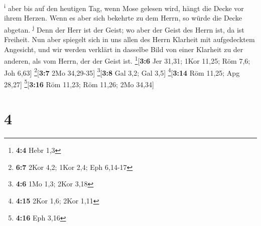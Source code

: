 \textsuperscript{i}  aber bis auf den heutigen Tag, wenn
Mose gelesen wird, hängt die Decke vor ihrem Herzen. 
Wenn es aber sich bekehrte zu dem Herrn, so würde die Decke abgetan.
\textsuperscript{j}  Denn der Herr ist der Geist; wo aber
der Geist des Herrn ist, da ist Freiheit.  Nun aber
spiegelt sich in uns allen des Herrn Klarheit mit aufgedecktem
Angesicht, und wir werden verklärt in dasselbe Bild von einer Klarheit
zu der anderen, als vom Herrn, der der Geist ist.
\footnote{\textbf{4:4} Hebr 1,3}{[}\textbf{3:6} Jer 31,31; 1Kor 11,25;
Röm 7,6; Joh 6,63{]} \footnote{\textbf{6:7} 2Kor 4,2; 1Kor 2,4; Eph
  6,14-17}{[}\textbf{3:7} 2Mo 34,29-35{]} \footnote{\textbf{4:6} 1Mo
  1,3; 2Kor 3,18}{[}\textbf{3:8} Gal 3,2; Gal 3,5{]}
\footnote{\textbf{4:15} 2Kor 1,6; 2Kor 1,11}{[}\textbf{3:14} Röm 11,25;
Apg 28,27{]} \footnote{\textbf{4:16} Eph 3,16}{[}\textbf{3:16} Röm
11,23; Röm 11,26; 2Mo 34,34{]}

\hypertarget{section-3}{%
\section{4}\label{section-3}}


